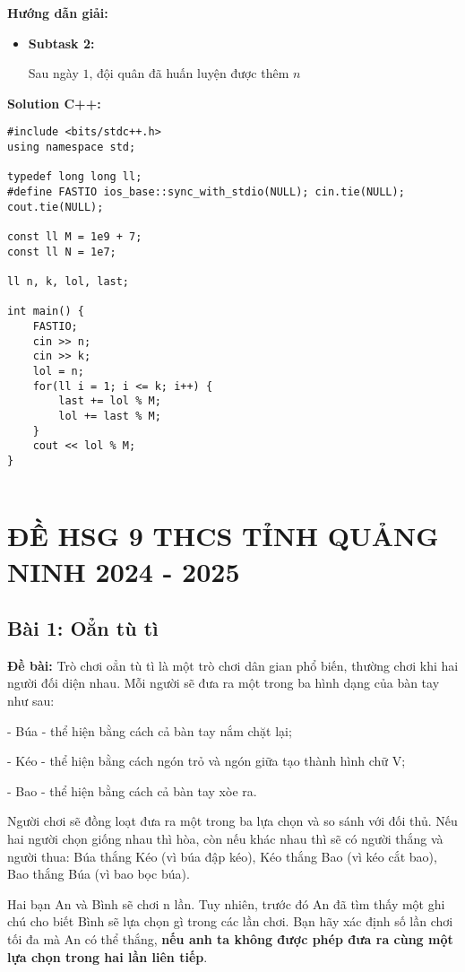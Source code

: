 \documentclass[12pt]{scrartcl}  %
\begin{document}
\textbf{Hướng dẫn giải:}

\begin{itemize}
    \item \textbf{Subtask 2:}
    
    Sau ngày $1$, đội quân đã huấn luyện được thêm $n$

\end{itemize}

\textbf{Solution C++:}
\begin{lstlisting}
#include <bits/stdc++.h>
using namespace std;

typedef long long ll;
#define FASTIO ios_base::sync_with_stdio(NULL); cin.tie(NULL); cout.tie(NULL);

const ll M = 1e9 + 7;
const ll N = 1e7;

ll n, k, lol, last;

int main() {
    FASTIO;
    cin >> n;
    cin >> k;
    lol = n;
    for(ll i = 1; i <= k; i++) {
        last += lol % M;
        lol += last % M;
    }
    cout << lol % M;
}


\end{lstlisting}

\section{ĐỀ HSG 9 THCS TỈNH QUẢNG NINH 2024 - 2025}

\subsection{Bài 1: Oẳn tù tì}
\textbf{Đề bài:}
Trò chơi oẳn tù tì là một trò chơi dân gian phổ biến, thường chơi khi hai người đối diện nhau. Mỗi người sẽ đưa ra một trong ba hình dạng của bàn tay như sau:

- Búa - thể hiện bằng cách cả bàn tay nắm chặt lại;

- Kéo - thể hiện bằng cách ngón trỏ và ngón giữa tạo thành hình chữ V;

- Bao - thể hiện bằng cách cả bàn tay xòe ra.

Người chơi sẽ đồng loạt đưa ra một trong ba lựa chọn và so sánh với đối thủ. Nếu hai người chọn giống nhau thì hòa, còn nếu khác nhau thì sẽ có người thắng và người thua: Búa thắng Kéo (vì búa đập kéo), Kéo thắng Bao (vì kéo cắt bao), Bao thắng Búa (vì bao bọc búa).

Hai bạn An và Bình sẽ chơi n lần. Tuy nhiên, trước đó An đã tìm thấy một ghi chú cho biết Bình sẽ lựa chọn gì trong các lần chơi. Bạn hãy xác định số lần chơi tối đa mà An có thể thắng, \textbf{nếu anh ta không được phép đưa ra cùng một lựa chọn trong hai lần liên tiếp}.
\end{document}
